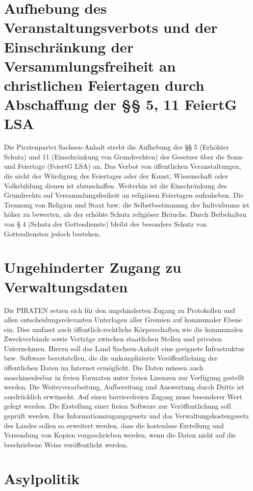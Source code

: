 \section{Aufhebung des Veranstaltungsverbots und der Einschränkung der
Versammlungsfreiheit an christlichen Feiertagen durch Abschaffung der §§ 5, 11
FeiertG LSA}

Die Piratenpartei Sachsen-Anhalt strebt die Aufhebung der §§ 5 (Erhöhter Schutz)
und 11 (Einschränkung von Grundrechten) des Gesetzes über die Sonn- und
Feiertage (FeiertG LSA) an. Das Verbot von öffentlichen Veranstaltungen, die
nicht der Würdigung des Feiertages oder der Kunst, Wissenschaft oder
Volksbildung dienen ist abzuschaffen. Weiterhin ist die Einschränkung des
Grundrechts auf Versammlungsfreiheit an religiösen Feiertagen aufzuheben. Die
Trennung von Religion und Staat bzw. die Selbstbestimmung des Individuums ist
höher zu bewerten, als der erhöhte Schutz religiöser Bräuche. Durch Beibehalten
von § 4 (Schutz der Gottesdienste) bleibt der besondere Schutz von
Gottesdiensten jedoch bestehen.

\section{Ungehinderter Zugang zu Verwaltungsdaten}

Die PIRATEN setzen sich für den ungehinderten Zugang zu Protokollen und allen
entscheidungsrelevanten Unterlagen aller Gremien auf kommunaler Ebene ein. Dies
umfasst auch öffentlich-rechtliche Körperschaften wie die kommunalen
Zweckverbände sowie Verträge zwischen staatlichen Stellen und privaten
Unternehmen.
Hierzu soll das Land Sachsen-Anhalt eine geeignete Infrastruktur bzw. Software
bereitstellen, die die unkomplizierte Veröffentlichung der öffentlichen Daten im
Internet ermöglicht. Die Daten müssen auch maschinenlesbar in freien Formaten
unter freien Lizenzen zur Verfügung gestellt werden. Die Weiterverarbeitung,
Aufbereitung und Auswertung durch Dritte ist ausdrücklich erwünscht. Auf einen
barrierefreien Zugang muss besonderer Wert gelegt werden. Die Erstellung einer
freien Software zur Veröffentlichung soll geprüft werden.
Das Informationszugangsgesetz und das Verwaltungskostengesetz des Landes sollen
so erweitert werden, dass die kostenlose Erstellung und Versendung von Kopien
vorgeschrieben werden, wenn die Daten nicht auf die beschriebene Weise
veröffentlicht werden.

\section{Asylpolitik}

